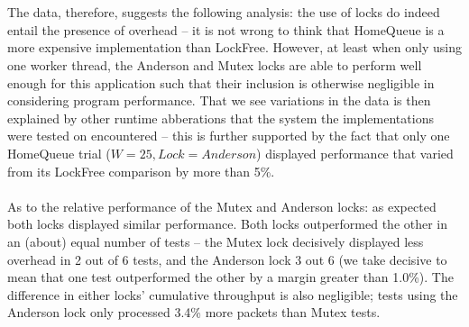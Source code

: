 \documentclass[]{article}
\begin{document}
\\\\
The data, therefore, suggests the following analysis: the use of locks do indeed entail the presence of overhead -- it is not wrong to think that HomeQueue is a more expensive implementation than LockFree. However, at least when only using one worker thread, the Anderson and Mutex locks are able to perform well enough for this application such that their inclusion is otherwise negligible in considering program performance. That we see variations in the data is then explained by other runtime abberations that the system the implementations were tested on encountered -- this is further supported by the fact that only one HomeQueue trial ($W = 25, Lock = Anderson$) displayed performance that varied from its LockFree comparison by more than 5\%.
\\\\
As to the relative performance of the Mutex and Anderson locks: as expected both locks displayed similar performance. Both locks outperformed the other in an (about) equal number of tests -- the Mutex lock decisively displayed less overhead in 2 out of 6 tests, and the Anderson lock 3 out 6 (we take decisive to mean that one test outperformed the other by a margin greater than 1.0\%). The difference in either locks' cumulative throughput is also negligible; tests using the Anderson lock only processed 3.4\% more packets than Mutex tests.
\end{document}
